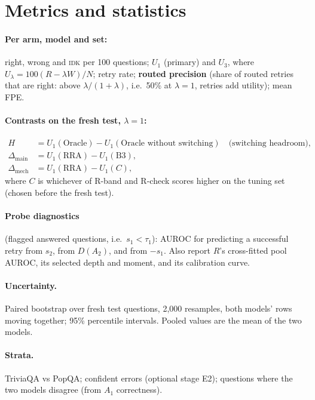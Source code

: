 \documentclass[11pt]{article}
\newcommand{\IDK}{\textsc{idk}}
\begin{document}
\section{Metrics and statistics}

\paragraph{Per arm, model and set:} right, wrong and \IDK{} per 100 questions; $U_1$ (primary) and $U_3$,
where $U_\lambda = 100(R - \lambda W)/N$; retry rate; \textbf{routed precision} (share of routed retries that
are right: above $\lambda/(1+\lambda)$, i.e.\ 50\% at $\lambda=1$, retries add utility); mean FPE.

\paragraph{Contrasts on the fresh test, $\lambda = 1$:}
\begin{align*}
H &= U_1(\mathrm{Oracle}) - U_1(\text{Oracle without switching})
   \quad \text{(switching headroom)},\\
\Delta_{\mathrm{main}} &= U_1(\mathrm{RRA}) - U_1(\mathrm{B3}),\\
\Delta_{\mathrm{mech}} &= U_1(\mathrm{RRA}) - U_1(C),
\end{align*}
where $C$ is whichever of R-band and R-check scores higher on the tuning set (chosen before the fresh test).

\paragraph{Probe diagnostics} (flagged answered questions, i.e.\ $s_1 < \tau_1$): AUROC for predicting a
successful retry from $s_2$, from $D(A_2)$, and from $-s_1$. Also report $R$'s cross-fitted pool AUROC, its
selected depth and moment, and its calibration curve.

\paragraph{Uncertainty.} Paired bootstrap over fresh test questions, 2,000 resamples, both models' rows moving
together; 95\% percentile intervals. Pooled values are the mean of the two models.

\paragraph{Strata.} TriviaQA vs PopQA; confident errors (optional stage E2); questions where the two models
disagree (from $A_1$ correctness).
\end{document}
